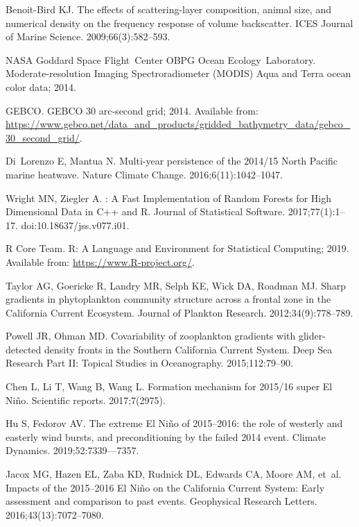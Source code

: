 \documentclass[10pt,letterpaper]{article}
\begin{document}
\begin{thebibliography}{10}
Benoit-Bird KJ.
\newblock The effects of scattering-layer composition, animal size, and
  numerical density on the frequency response of volume backscatter.
\newblock ICES Journal of Marine Science. 2009;66(3):582--593.

NASA Goddard Space Flight~Center OBPG Ocean Ecology~Laboratory.
  Moderate-resolution Imaging Spectroradiometer (MODIS) Aqua and Terra ocean
  color data; 2014.

GEBCO. GEBCO 30 arc-second grid; 2014.
\newblock Available from:
  \url{https://www.gebco.net/data_and_products/gridded_bathymetry_data/gebco_30_second_grid/}.

Di~Lorenzo E, Mantua N.
\newblock Multi-year persistence of the 2014/15 North Pacific marine heatwave.
\newblock Nature Climate Change. 2016;6(11):1042--1047.

Wright MN, Ziegler A.
: A Fast Implementation of Random Forests for High
  Dimensional Data in {C++} and {R}.
\newblock Journal of Statistical Software. 2017;77(1):1--17.
\newblock doi:{10.18637/jss.v077.i01}.

{R Core Team}. R: A Language and Environment for Statistical Computing; 2019.
\newblock Available from: \url{https://www.R-project.org/}.

Taylor AG, Goericke R, Landry MR, Selph KE, Wick DA, Roadman MJ.
\newblock Sharp gradients in phytoplankton community structure across a frontal
  zone in the California Current Ecosystem.
\newblock Journal of Plankton Research. 2012;34(9):778--789.

Powell JR, Ohman MD.
\newblock Covariability of zooplankton gradients with glider-detected density
  fronts in the Southern California Current System.
\newblock Deep Sea Research Part II: Topical Studies in Oceanography.
  2015;112:79--90.

Chen L, Li T, Wang B, Wang L.
\newblock Formation mechanism for 2015/16 super El Ni{\~n}o.
\newblock Scientific reports. 2017;7(2975).

Hu S, Fedorov AV.
\newblock The extreme El Ni{\~n}o of 2015--2016: the role of westerly and
  easterly wind bursts, and preconditioning by the failed 2014 event.
\newblock Climate Dynamics. 2019;52:7339--–7357.

Jacox MG, Hazen EL, Zaba KD, Rudnick DL, Edwards CA, Moore AM, et~al.
\newblock Impacts of the 2015--2016 El Ni{\~n}o on the California Current
  System: Early assessment and comparison to past events.
\newblock Geophysical Research Letters. 2016;43(13):7072--7080.


\end{thebibliography}
\end{document}
